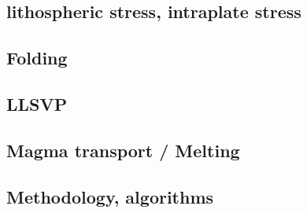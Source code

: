 \cite{daco88}
\cite{nefo93}
\cite{thsj97}
\cite{bird98}
\cite{lecd98}
\cite{will99b}
\cite{hanl00}\cite{labp00}
\cite{homo01}\cite{beoc01}
\cite{labu02}\cite{coli02}
\cite{wipo03}\cite{wabu03}
\cite{tibb04}
\cite{hagu05}\cite{wiwg05}
\cite{libi06}
\cite{afrf07}
\cite{affr08}\cite{tibb08}
\cite{hapo08}
\cite{hamo10}
\cite{rera11}
\cite{wagw12}\cite{vacl12}
\cite{wazh13}
\cite{kava14}\cite{dusp14}\cite{rugb14}\cite{wavp14}\cite{whbb14}\cite{scml14}
\cite{wavp15}\cite{thkp15}
\cite{rugb17}
\cite{koen19}

\subsection*{lithospheric stress, intraplate stress}

\cite{fouy75}
\cite{riso76}
\cite{riso79}
\cite{worg91}
\cite{rich92}\cite{wuvr92}\cite{zoba92}
\cite{stsm01}
\cite{ligu04}
\cite{timr05}
\cite{bilr08}\cite{ghhw08}
\cite{ghhf09}
\cite{nacl09}
\cite{nalr12}\cite{ghho12}
\cite{ghhw13}


\subsection*{Folding}

\cite{ramb68}
\cite{ramb70}
\cite{ramb71}
\cite{reds12}
\cite{regc13}

\subsection*{LLSVP}

\cite{limc13}

\subsection*{Magma transport / Melting}

\cite{yatd12}
\cite{lorg18}

\subsection*{Methodology, algorithms}

\cite{leka93}


